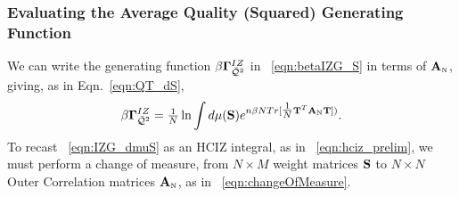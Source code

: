 %



\subsubsection{Evaluating the Average Quality (Squared) Generating Function }
\label{sxn:matgen_quality_hciz_B}

We can write the generating function $\beta\mathbf{\Gamma}^{IZ}_{\bar{\mathcal{Q}}^{2}}$ 
in \EQN~\ref{eqn:betaIZG_S} 
in terms of ${\mathbf{A}}_{\text{\tiny N}}$, giving, as in Eqn.~\ref{eqn:QT_dS}, 
\begin{align}
  \label{eqn:IZG_dmuS}
  \beta\mathbf{\Gamma}^{IZ}_{\bar{\mathcal{Q}}^{2}} = \tfrac{1}{N}\ln \int d\mu({\mathbf{S}})  e^{ n\beta N Tr[\tfrac{1}{N}{\mathbf{T}}^T{\mathbf{A}}_{\text{\tiny N}}{\mathbf{T}}]) }  .
\end{align}
To recast \EQN~\ref{eqn:IZG_dmuS} as an HCIZ integral, as in \EQN~\ref{eqn:hciz_prelim},
we must perform a change of measure,
 from $N\times M$ \Student weight matrices ${\mathbf{S}}$ to $N\times N$ Outer \Student Correlation matrices ${\mathbf{A}}_{\text{\tiny N}}$, as in \EQN~\ref{eqn:changeOfMeasure}.


